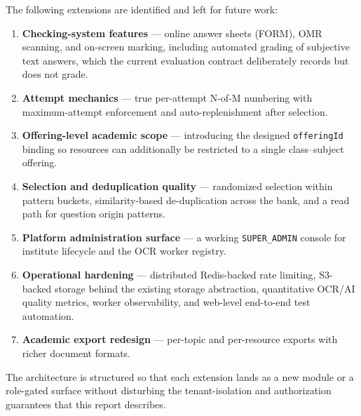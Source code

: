 \noindent The following extensions are identified and left for future work:

\begin{enumerate}
  \item \textbf{Checking-system features} --- online answer sheets (FORM),
  OMR scanning, and on-screen marking, including automated grading of
  subjective text answers, which the current evaluation contract deliberately
  records but does not grade.
  \item \textbf{Attempt mechanics} --- true per-attempt N-of-M numbering with
  maximum-attempt enforcement and auto-replenishment after selection.
  \item \textbf{Offering-level academic scope} --- introducing the designed
  \texttt{offeringId} binding so resources can additionally be restricted to a
  single class--subject offering.
  \item \textbf{Selection and deduplication quality} --- randomized selection
  within pattern buckets, similarity-based de-duplication across the bank, and
  a read path for question origin patterns.
  \item \textbf{Platform administration surface} --- a working
  \texttt{SUPER\_ADMIN} console for institute lifecycle and the OCR worker
  registry.
  \item \textbf{Operational hardening} --- distributed Redis-backed rate
  limiting, S3-backed storage behind the existing storage abstraction,
  quantitative OCR/AI quality metrics, worker observability, and web-level
  end-to-end test automation.
  \item \textbf{Academic export redesign} --- per-topic and per-resource
  exports with richer document formats.
\end{enumerate}

\noindent The architecture is structured so that each extension lands as a new
module or a role-gated surface without disturbing the tenant-isolation and
authorization guarantees that this report describes.